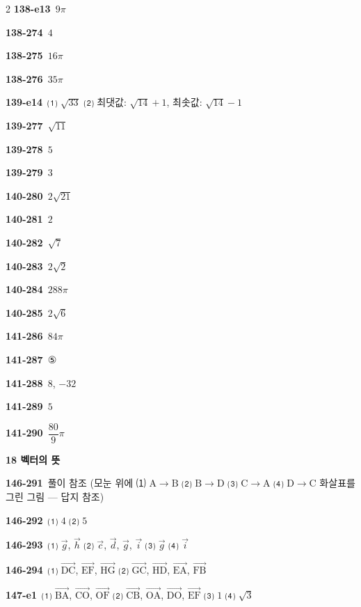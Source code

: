 \documentclass[10pt,a4paper]{article}
\newcommand{\pt}[1]{\mathrm{#1}}
\begin{document}
\begin{multicols}{2}
\noindent\textbf{138-e13}\ $9\pi$\par
\noindent\textbf{138-274}\ $4$\par
\noindent\textbf{138-275}\ $16\pi$\par
\noindent\textbf{138-276}\ $35\pi$\par
\noindent\textbf{139-e14}\ ⑴ $\sqrt{33}$ ⑵ 최댓값: $\sqrt{14}+1$, 최솟값: $\sqrt{14}-1$\par
\noindent\textbf{139-277}\ $\sqrt{11}$\par
\noindent\textbf{139-278}\ $5$\par
\noindent\textbf{139-279}\ $3$\par
\noindent\textbf{140-280}\ $2\sqrt{21}$\par
\noindent\textbf{140-281}\ $2$\par
\noindent\textbf{140-282}\ $\sqrt{7}$\par
\noindent\textbf{140-283}\ $2\sqrt{2}$\par
\noindent\textbf{140-284}\ $288\pi$\par
\noindent\textbf{140-285}\ $2\sqrt{6}$\par
\noindent\textbf{141-286}\ $84\pi$\par
\noindent\textbf{141-287}\ ⑤\par
\noindent\textbf{141-288}\ $8$, $-32$\par
\noindent\textbf{141-289}\ $5$\par
\noindent\textbf{141-290}\ $\dfrac{80}{9}\pi$\par
\noindent\textbf{18 벡터의 뜻}\par\smallskip
\noindent\textbf{146-291}\ 풀이 참조 (모눈 위에 ⑴ $\pt{A}\to\pt{B}$ ⑵ $\pt{B}\to\pt{D}$ ⑶ $\pt{C}\to\pt{A}$ ⑷ $\pt{D}\to\pt{C}$ 화살표를 그린 그림 — 답지 참조)\par
\noindent\textbf{146-292}\ ⑴ $4$ ⑵ $5$\par
\noindent\textbf{146-293}\ ⑴ $\vec{g}$, $\vec{h}$ ⑵ $\vec{c}$, $\vec{d}$, $\vec{g}$, $\vec{i}$ ⑶ $\vec{g}$ ⑷ $\vec{i}$\par
\noindent\textbf{146-294}\ ⑴ $\overrightarrow{\pt{DC}}$, $\overrightarrow{\pt{EF}}$, $\overrightarrow{\pt{HG}}$ ⑵ $\overrightarrow{\pt{GC}}$, $\overrightarrow{\pt{HD}}$, $\overrightarrow{\pt{EA}}$, $\overrightarrow{\pt{FB}}$\par
\noindent\textbf{147-e1}\ ⑴ $\overrightarrow{\pt{BA}}$, $\overrightarrow{\pt{CO}}$, $\overrightarrow{\pt{OF}}$ ⑵ $\overrightarrow{\pt{CB}}$, $\overrightarrow{\pt{OA}}$, $\overrightarrow{\pt{DO}}$, $\overrightarrow{\pt{EF}}$ ⑶ $1$ ⑷ $\sqrt{3}$\par

\end{multicols}
\end{document}
